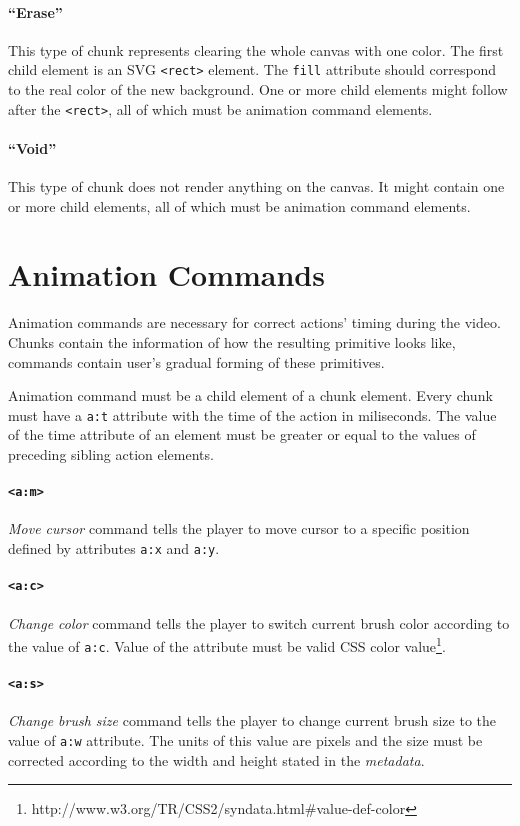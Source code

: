\paragraph{``Erase''}
This type of chunk represents clearing the whole canvas with one color. The first child element is an SVG \verb|<rect>| element. The \verb|fill| attribute should correspond to the real color of the new background. One or more child elements might follow after the \verb|<rect>|, all of which must be animation command elements.

\paragraph{``Void''}
This type of chunk does not render anything on the canvas. It might contain one or more child elements, all of which must be animation command elements.

\section{Animation Commands}
Animation commands are necessary for correct actions' timing during the video. Chunks contain the information of how the resulting primitive looks like, commands contain user's gradual forming of these primitives.

Animation command must be a child element of a chunk element. Every chunk must have a \verb|a:t| attribute with the time of the action in miliseconds. The value of the time attribute of an element must be greater or equal to the values of preceding sibling action elements.

\paragraph{\texttt{\textless a:m\textgreater}}
\textit{Move cursor} command tells the player to move cursor to a specific position defined by attributes \verb|a:x| and \verb|a:y|.

\paragraph{\texttt{\textless a:c\textgreater}}
\textit{Change color} command tells the player to switch current brush color according to the value of \verb|a:c|. Value of the attribute must be valid CSS color value\footnote{http://www.w3.org/TR/CSS2/syndata.html\#value-def-color}.

\paragraph{\texttt{\textless a:s\textgreater}}
\textit{Change brush size} command tells the player to change current brush size to the value of \verb|a:w| attribute. The units of this value are pixels and the size must be corrected according to the width and height stated in the \textit{metadata}.

